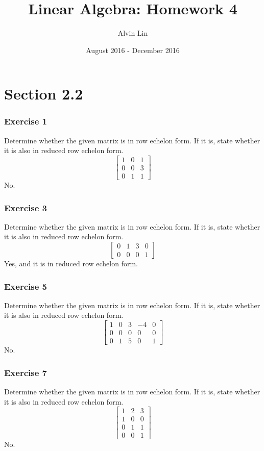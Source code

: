 \documentclass[letterpaper, 12pt]{math}
\title{Linear Algebra: Homework 4}
\author{Alvin Lin}
\date{August 2016 - December 2016}
\begin{document}
\maketitle

\section*{Section 2.2}

\subsubsection*{Exercise 1}
Determine whether the given matrix is in row echelon form. If it is, state
whether it is also in reduced row echelon form.
\[ \begin{bmatrix}
  1 & 0 & 1 \\
  0 & 0 & 3 \\
  0 & 1 & 1
\end{bmatrix} \]
No.

\subsubsection*{Exercise 3}
Determine whether the given matrix is in row echelon form. If it is, state
whether it is also in reduced row echelon form.
\[ \begin{bmatrix}
  0 & 1 & 3 & 0 \\
  0 & 0 & 0 & 1
\end{bmatrix} \]
Yes, and it is in reduced row echelon form.

\subsubsection*{Exercise 5}
Determine whether the given matrix is in row echelon form. If it is, state
whether it is also in reduced row echelon form.
\[ \begin{bmatrix}
  1 & 0 & 3 & -4 & 0 \\
  0 & 0 & 0 & 0 & 0 \\
  0 & 1 & 5 & 0 & 1
\end{bmatrix} \]
No.

\subsubsection*{Exercise 7}
Determine whether the given matrix is in row echelon form. If it is, state
whether it is also in reduced row echelon form.
\[ \begin{bmatrix}
  1 & 2 & 3 \\
  1 & 0 & 0 \\
  0 & 1 & 1 \\
  0 & 0 & 1
\end{bmatrix} \]
No.
\end{document}
